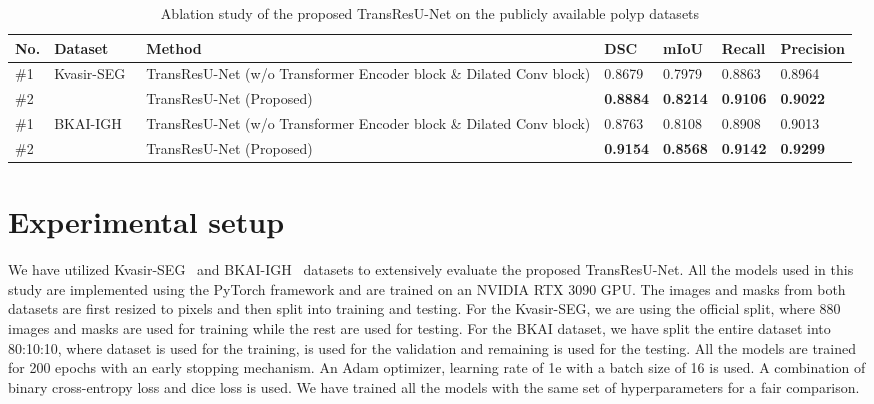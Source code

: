 \documentclass[conference]{IEEEtran}
\begin{document}
\begin{table*} [!t]
\caption{Ablation study of the proposed TransResU-Net on the publicly available polyp datasets}
\centering
\begin{tabular}{@{}l|l|l|l|l|l|l@{}} 
\toprule
\textbf{No.} &\textbf{Dataset} &\textbf{Method} &\textbf{DSC} &\textbf{mIoU} & \textbf{Recall} & \textbf{Precision}\\ 
\midrule

\#1&\multirow{2}{7em}{Kvasir-SEG~\cite{jha2020kvasir}} &TransResU-Net (w/o Transformer Encoder block \& Dilated Conv block) &0.8679	&0.7979	&0.8863	&0.8964 \\

\#2  & &TransResU-Net (Proposed)  &\textbf{0.8884}	&\textbf{0.8214}	&\textbf{0.9106}	&\textbf{0.9022}\\

\midrule
\#1 &\multirow{2}{7em}{BKAI-IGH~\cite{lan2021neounet}} &TransResU-Net (w/o Transformer Encoder block \& Dilated Conv block) &0.8763 &0.8108 &0.8908 &0.9013 \\
\#2 & &TransResU-Net (Proposed) &\textbf{0.9154} &\textbf{0.8568} &\textbf{0.9142} &\textbf{0.9299} \\
\bottomrule
\end{tabular}
\label{table:ablation-study-table}
\end{table*}
\section{Experimental setup}
\vspace{-1mm}
We have utilized Kvasir-SEG~\cite{jha2020kvasir} and BKAI-IGH~\cite{lan2021neounet} datasets to extensively evaluate the proposed TransResU-Net. All the models used in this study are implemented using the PyTorch framework and are trained on an NVIDIA RTX 3090 GPU. The images and masks from both datasets are first resized to  pixels and then split into training and testing. For the Kvasir-SEG, we are using the official split, where 880 images and masks are used for training while the rest are used for testing. For the BKAI dataset, we have split the entire dataset into 80:10:10, where  dataset is used for the training,  is used for the validation and remaining  is used for the testing. All the models are trained for 200 epochs with an early stopping mechanism. An Adam optimizer, learning rate of 1e  with a batch size of 16 is used. A combination of binary cross-entropy loss and dice loss is used. We have trained all the models with the same set of hyperparameters for a fair comparison.
\end{document}
